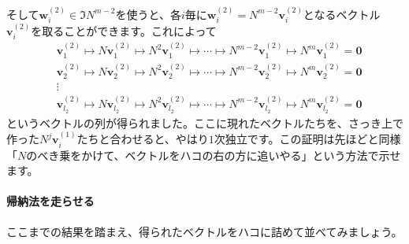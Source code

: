 そして$\bm{w}^{(2)}_i \in \Im N^{m - 2}$を使うと、各$i$毎に$\bm{w}^{(2)}_i = N^{m - 2} \bm{v}^{(2)}_i$となるベクトル$\bm{v}^{(2)}_i$を取ることができます。これによって
\begin{align*}
&\bm{v}^{(2)}_1 \mapsto N \bm{v}^{(2)}_1 \mapsto N^2 \bm{v}^{(2)}_1 \mapsto \cdots \mapsto N^{m - 2} \bm{v}^{(2)}_1 \mapsto N^m \bm{v}^{(2)}_1 = \bm{0} \\
&\bm{v}^{(2)}_2 \mapsto N \bm{v}^{(2)}_2 \mapsto N^2 \bm{v}^{(2)}_2 \mapsto \cdots \mapsto N^{m - 2} \bm{v}^{(2)}_2 \mapsto N^m \bm{v}^{(2)}_2 = \bm{0} \\
&\vdots \\
&\bm{v}^{(2)}_{l_2} \mapsto N \bm{v}^{(2)}_{l_2} \mapsto N^2 \bm{v}^{(2)}_{l_2} \mapsto \cdots \mapsto N^{m - 2} \bm{v}^{(2)}_{l_2} \mapsto N^m \bm{v}^{(2)}_{l_2} = \bm{0}
\end{align*}
というベクトルの列が得られました。ここに現れたベクトルたちを、さっき上で作った$N^j \bm{v}^{(1)}_i$たちと合わせると、やはり$1$次独立です。この証明は先ほどと同様「$N$のべき乗をかけて、ベクトルをハコの右の方に追いやる」という方法で示せます。

\newpage

\paragraph{帰納法を走らせる}

ここまでの結果を踏まえ、得られたベクトルをハコに詰めて並べてみましょう。

